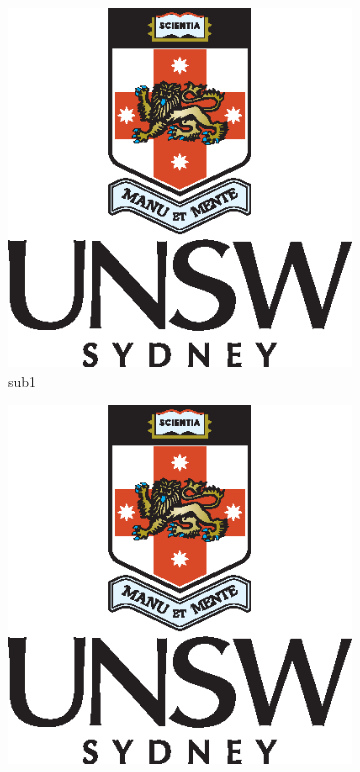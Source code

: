 \begin{figure}[!ht]
  \centering
\begin{subfigure}[!ht]{0.3\linewidth}
  \centering
    \includegraphics[width=\textwidth]{unswlogo.eps}
    \caption{sub1} 
    \label{f:sub1}
\end{subfigure}
\begin{subfigure}[!ht]{0.3\linewidth}
  \centering
    \includegraphics[width=\textwidth]{unswlogo.eps}

\end{subfigure}
\end{figure}

